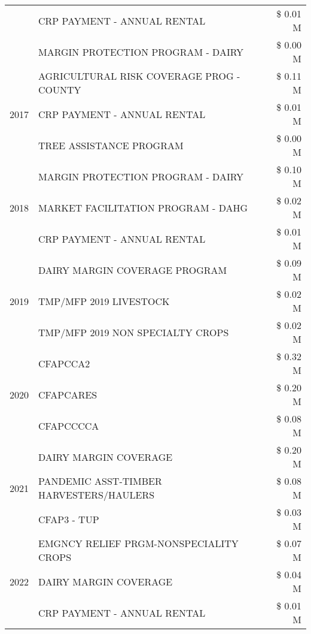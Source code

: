 \begin{tabular}{llr}
 & CRP PAYMENT - ANNUAL RENTAL & \$ 0.01 M \\
 & MARGIN PROTECTION PROGRAM - DAIRY & \$ 0.00 M \\
\cline{1-3}
\multirow[t]{3}{*}{2017} & AGRICULTURAL RISK COVERAGE PROG - COUNTY & \$ 0.11 M \\
 & CRP PAYMENT - ANNUAL RENTAL & \$ 0.01 M \\
 & TREE ASSISTANCE PROGRAM & \$ 0.00 M \\
\cline{1-3}
\multirow[t]{3}{*}{2018} & MARGIN PROTECTION PROGRAM - DAIRY & \$ 0.10 M \\
 & MARKET FACILITATION PROGRAM - DAHG & \$ 0.02 M \\
 & CRP PAYMENT - ANNUAL RENTAL & \$ 0.01 M \\
\cline{1-3}
\multirow[t]{3}{*}{2019} & DAIRY MARGIN COVERAGE PROGRAM & \$ 0.09 M \\
 & TMP/MFP 2019 LIVESTOCK & \$ 0.02 M \\
 & TMP/MFP 2019 NON SPECIALTY CROPS & \$ 0.02 M \\
\cline{1-3}
\multirow[t]{3}{*}{2020} & CFAPCCA2 & \$ 0.32 M \\
 & CFAPCARES & \$ 0.20 M \\
 & CFAPCCCCA & \$ 0.08 M \\
\cline{1-3}
\multirow[t]{3}{*}{2021} & DAIRY MARGIN COVERAGE & \$ 0.20 M \\
 & PANDEMIC ASST-TIMBER HARVESTERS/HAULERS & \$ 0.08 M \\
 & CFAP3 - TUP & \$ 0.03 M \\
\cline{1-3}
\multirow[t]{3}{*}{2022} & EMGNCY RELIEF PRGM-NONSPECIALITY CROPS & \$ 0.07 M \\
 & DAIRY MARGIN COVERAGE & \$ 0.04 M \\
 & CRP PAYMENT - ANNUAL RENTAL & \$ 0.01 M \\
\cline{1-3}
\bottomrule
\end{tabular}
